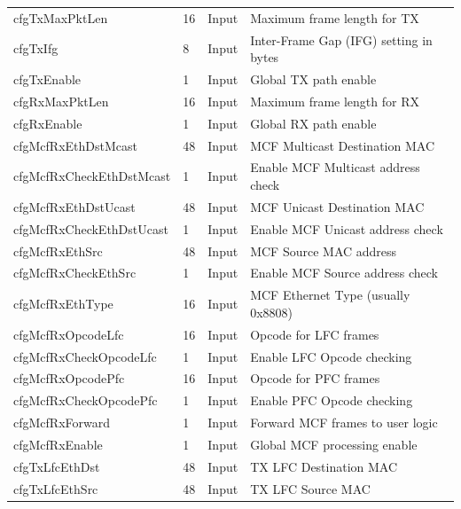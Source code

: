 \begin{longtable}[H]{
    | p{}
    | p{}
    | p{}
    | p{} |
  }
  \rowcolor{fog-grey} \multicolumn{4}{|l|}{\textbf{Runtime Configuration}} \\ \hline
  cfgTxMaxPktLen     & 16             & Input  & Maximum frame length for TX \\ \hline
  cfgTxIfg           & 8              & Input  & Inter-Frame Gap (IFG) setting in bytes \\ \hline
  cfgTxEnable        & 1              & Input  & Global TX path enable \\ \hline
  cfgRxMaxPktLen     & 16             & Input  & Maximum frame length for RX \\ \hline
  cfgRxEnable        & 1              & Input  & Global RX path enable \\ \hline
  cfgMcfRxEthDstMcast     & 48        & Input  & MCF Multicast Destination MAC \\ \hline
  cfgMcfRxCheckEthDstMcast& 1         & Input  & Enable MCF Multicast address check \\ \hline
  cfgMcfRxEthDstUcast     & 48        & Input  & MCF Unicast Destination MAC \\ \hline
  cfgMcfRxCheckEthDstUcast& 1         & Input  & Enable MCF Unicast address check \\ \hline
  cfgMcfRxEthSrc          & 48        & Input  & MCF Source MAC address \\ \hline
  cfgMcfRxCheckEthSrc     & 1         & Input  & Enable MCF Source address check \\ \hline
  cfgMcfRxEthType         & 16        & Input  & MCF Ethernet Type (usually 0x8808) \\ \hline
  cfgMcfRxOpcodeLfc        & 16        & Input  & Opcode for LFC frames \\ \hline
  cfgMcfRxCheckOpcodeLfc   & 1         & Input  & Enable LFC Opcode checking \\ \hline
  cfgMcfRxOpcodePfc        & 16        & Input  & Opcode for PFC frames \\ \hline
  cfgMcfRxCheckOpcodePfc   & 1         & Input  & Enable PFC Opcode checking \\ \hline
  cfgMcfRxForward          & 1         & Input  & Forward MCF frames to user logic \\ \hline
  cfgMcfRxEnable           & 1         & Input  & Global MCF processing enable \\ \hline
  cfgTxLfcEthDst          & 48        & Input  & TX LFC Destination MAC \\ \hline
  cfgTxLfcEthSrc          & 48        & Input  & TX LFC Source MAC \\ \hline

\end{longtable}
